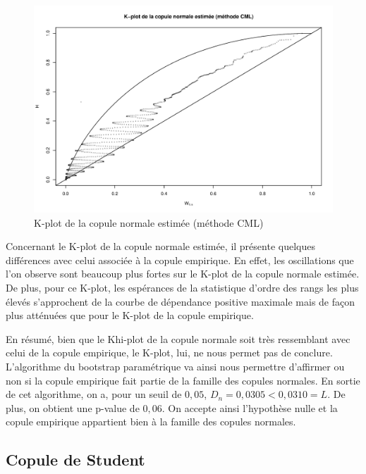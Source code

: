 \noindent%
\begin{figure}[H]
    \begin{center}
      \includegraphics[width=17 cm, angle=0]{./pictures/normalcmlkplot.png}
      \centering\caption{\label{2}K-plot de la copule normale estimée (méthode CML)}
    \end{center}
\end{figure}

Concernant le K-plot de la copule normale estimée, il présente quelques différences avec celui associée à la copule empirique. En effet, les oscillations que l'on observe sont beaucoup plus fortes sur le K-plot de la copule normale estimée. De plus, pour ce K-plot, les espérances de la statistique d'ordre des rangs les plus élevés s'approchent de la courbe de dépendance positive maximale mais de façon plus atténuées que pour le K-plot de la copule empirique.

En résumé, bien que le Khi-plot de la copule normale soit très ressemblant avec celui de la copule empirique, le K-plot, lui, ne nous permet pas de conclure. L'algorithme du bootstrap paramétrique va ainsi nous permettre d'affirmer ou non si la copule empirique fait partie de la famille des copules normales. En sortie de cet algorithme, on a, pour un seuil de $0,05$, $D_n = 0,0305 < 0,0310 = L$. De plus, on obtient une p-value de $0,06$. On accepte ainsi l'hypothèse nulle et la copule empirique appartient bien à la famille des copules normales.

\subsection{Copule de Student}



